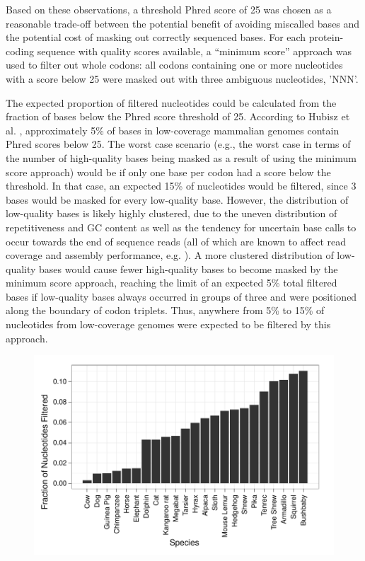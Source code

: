 Based on these observations, a threshold Phred score of 25 was chosen
as a reasonable trade-off between the potential benefit of avoiding
miscalled bases and the potential cost of masking out correctly
sequenced bases. For each protein-coding sequence with quality scores
available, a ``minimum score'' approach was used to filter out whole
codons: all codons containing one or more nucleotides with a score
below 25 were masked out with three ambiguous nucleotides, 'NNN'.

The expected proportion of filtered nucleotides could be calculated
from the fraction of bases below the Phred score threshold of
25. According to Hubisz et al. \citeyearpar{Hubisz2011}, approximately
5\% of bases in low-coverage mammalian genomes contain Phred scores
below 25. The worst case scenario (e.g., the worst case in terms of
the number of high-quality bases being masked as a result of using the
minimum score approach) would be if only one base per codon had a
score below the threshold. In that case, an expected 15\% of
nucleotides would be filtered, since 3 bases would be masked for every
low-quality base. However, the distribution of low-quality bases is
likely highly clustered, due to the uneven distribution of
repetitiveness and GC content as well as the tendency for uncertain
base calls to occur towards the end of sequence reads (all of which
are known to affect read coverage and assembly performance,
e.g. \cite{Teytelman2009}). A more clustered distribution of
low-quality bases would cause fewer high-quality bases to become
masked by the minimum score approach, reaching the limit of an
expected 5\% total filtered bases if low-quality bases always occurred
in groups of three and were positioned along the boundary of codon
triplets. Thus, anywhere from 5\% to 15\% of nucleotides from
low-coverage genomes were expected to be filtered by this approach.

\begin{figure}
\centering
\includegraphics[scale=0.7]{Figs/filtered_qual_bars.pdf}
\caption{}
\label{filtered_qual_bars}
\end{figure}

